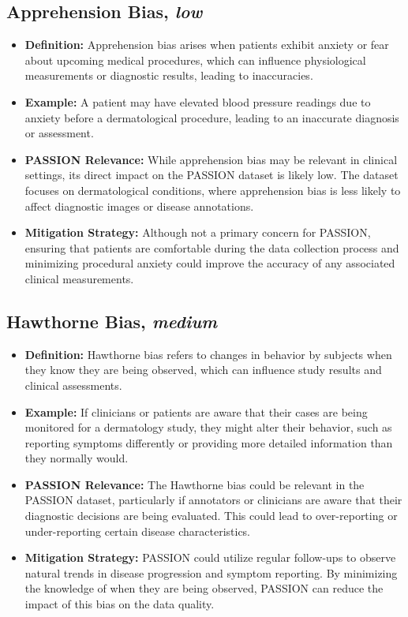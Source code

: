 \begin{refsection}
		\subsection{Apprehension Bias, \textit{low}}
		\begin{itemize}
			\item \textbf{Definition:} Apprehension bias arises when patients exhibit anxiety or fear about upcoming medical procedures, which can influence physiological measurements or diagnostic results, leading to inaccuracies.
			\item \textbf{Example:} A patient may have elevated blood pressure readings due to anxiety before a dermatological procedure, leading to an inaccurate diagnosis or assessment.
			\item \textbf{PASSION Relevance:} While apprehension bias may be relevant in clinical settings, its direct impact on the PASSION dataset is likely low. The dataset focuses on dermatological conditions, where apprehension bias is less likely to affect diagnostic images or disease annotations.
			\item \textbf{Mitigation Strategy:} Although not a primary concern for PASSION, ensuring that patients are comfortable during the data collection process and minimizing procedural anxiety could improve the accuracy of any associated clinical measurements.
		\end{itemize}
		
		\subsection{Hawthorne Bias, \textit{medium}}
		\begin{itemize}
			\item \textbf{Definition:} Hawthorne bias refers to changes in behavior by subjects when they know they are being observed, which can influence study results and clinical assessments.
			\item \textbf{Example:} If clinicians or patients are aware that their cases are being monitored for a dermatology study, they might alter their behavior, such as reporting symptoms differently or providing more detailed information than they normally would.
			\item \textbf{PASSION Relevance:} The Hawthorne bias could be relevant in the PASSION dataset, particularly if annotators or clinicians are aware that their diagnostic decisions are being evaluated. This could lead to over-reporting or under-reporting certain disease characteristics.
			\item \textbf{Mitigation Strategy:} PASSION could utilize regular follow-ups to observe natural trends in disease progression and symptom reporting. By minimizing the knowledge of when they are being observed, PASSION can reduce the impact of this bias on the data quality.
		\end{itemize}
		

\end{refsection}
